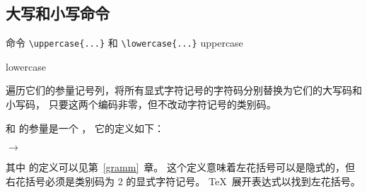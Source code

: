 \documentclass{book}
\begin{document}
\subsection{大写和小写命令}
\label{upcase}

命令 \verb-\uppercase{...}- 和 \verb-\lowercase{...}-
\cstoidx uppercase\par\cstoidx lowercase\par
遍历它们的参量记号列，将所有显式字符记号的字符码分别替换为它们的大写码和小写码，
只要这两个编码非零，但不改动字符记号的类别码。

 和  的参量是一个 ，
它的定义如下：
\begin{Disp}  $\longrightarrow$ \lb
      \end{Disp}
其中  的定义可以见第~\ref{gramm}~章。
这个定义意味着左花括号可以是隐式的，但右花括号必须是类别码为 2 的显式字符记号。
\TeX\ 展开表达式以找到左花括号。
\end{document}
